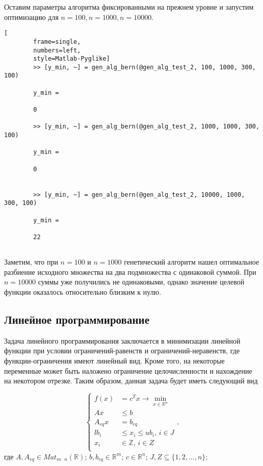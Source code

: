 \documentclass[../main.tex]{subfiles}
\begin{document}
	Оставим параметры алгоритма фиксированными на прежнем уровне и запустим оптимизацию для $n=100, n=1000, n=10000$.
	
	 	\begin{lstlisting}[
	 	frame=single,
	 	numbers=left,
	 	style=Matlab-Pyglike]
	 	>> [y_min, ~] = gen_alg_bern(@gen_alg_test_2, 100, 1000, 300, 100)
	 	
	 	y_min =
	 	
	 	0
	 	
	 	>> [y_min, ~] = gen_alg_bern(@gen_alg_test_2, 1000, 1000, 300, 100)
	 	
	 	y_min =
	 	
	 	0
	 	
	 	
	 	>> [y_min, ~] = gen_alg_bern(@gen_alg_test_2, 10000, 1000, 300, 100)
	 	
	 	y_min =
	 	
	 	22
	 	
	 \end{lstlisting}
 
 	Заметим, что при $n=100$ и $n=1000$ генетический алгоритм нашел оптимальное разбиение исходного множества на два подмножества с одинаковой суммой. При $n=10000$ суммы уже получились не одинаковыми, однако значение целевой функции оказалось относительно близким к нулю.
 	
 	\subsection{Линейное программирование}
 	
 	Задача линейного программирования заключается в минимизации линейной функции при условии ограничений-равенств и ограничений-неравенств, где функции-ограничения имеют линейный вид. Кроме того, на некоторые переменные может быть наложено ограничение целочисленности и нахождение на некотором отрезке. Таким образом, данная задача будет иметь следующий вид
 	
 	\[\left\{\begin{aligned}
 		f(x) &= c^T x \rightarrow \underset{x \in \mathbb{R}^n}{\min} \\ 
 		Ax &\leqslant b \\
 		A_{eq} x &= b_{eq} \\
 		lb_i &\leqslant x_i \leqslant ub_i \text{, } i \in J \\
 		x_i &\in \mathbb{Z}  \text{, }  i \in Z\\
 	\end{aligned}\right.,\]
 	где $A, A_{eq} \in Mat_{m \text{ } n}(\mathbb{R})$; $b, b_{eq} \in \mathbb{R}^m$; $c \in \mathbb{R}^n$; $J, Z \subseteq \{1, 2, \dots, n\}$;
 	 
\end{document}
